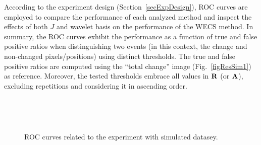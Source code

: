 \documentclass[journal]{IEEEtran}
\newcommand{\vA}{{\textbf A}}
\newcommand{\vR}{{\textbf R}}
\begin{document}
According to the experiment design (Section~\ref{secExpDesign}), ROC curves are employed to compare the performance of each analyzed method and inspect the effects of both $J$ and wavelet basis on the performance of the WECS method. In summary, the ROC curves exhibit the performance as a function of true and false positive ratios when distinguishing two events (in this context, the change and non-changed pixels/positions) using distinct thresholds. The true and false positive ratios are computed using the ``total change'' image (Fig.~\ref{figResSim1}) as reference. Moreover, the tested thresholds embrace all values in $\vR$ (or $\vA$), excluding repetitions and considering it in ascending order.



\begin{figure}[hbt]
\centering

\mbox{
 \quad
{}
}

\mbox{
}

\caption{ROC curves related to the experiment with simulated datasey.}\label{F:EllipsoidChanges_details}
\end{figure}
\end{document}
